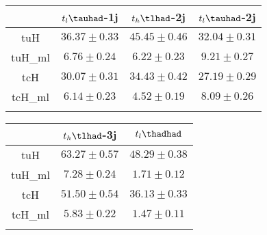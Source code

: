 \centering
\begin{tabular}{cccc} \toprule\toprule
 & $t_l\tauhad$-1j & $t_h\tlhad$-2j & $t_l\tauhad$-2j  \\\midrule
tuH & $36.37\pm0.33$ & $45.45\pm0.46$ & $32.04\pm0.31$\\
tuH\_ml & $6.76\pm0.24$ & $6.22\pm0.23$ & $9.21\pm0.27$\\
tcH & $30.07\pm0.31$ & $34.43\pm0.42$ & $27.19\pm0.29$\\
tcH\_ml & $6.14\pm0.23$ & $4.52\pm0.19$ & $8.09\pm0.26$\\
\bottomrule\bottomrule\\
\end{tabular}
\begin{tabular}{ccc} \toprule\toprule
&$t_h\tlhad$-3j &$t_l\thadhad$  \\\midrule
tuH & $63.27\pm0.57$ & $48.29\pm0.38$\\
tuH\_ml & $7.28\pm0.24$ & $1.71\pm0.12$\\
tcH & $51.50\pm0.54$ & $36.13\pm0.33$\\
tcH\_ml & $5.83\pm0.22$ & $1.47\pm0.11$\\
\bottomrule\bottomrule\\
\end{tabular}

